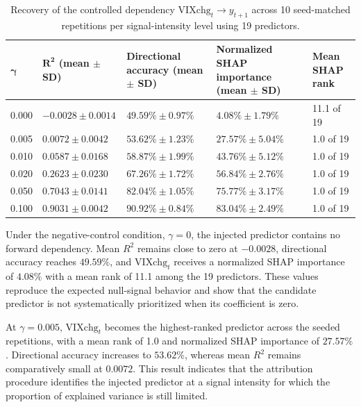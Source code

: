 \documentclass[utf8]{FrontiersinHarvard} %
\begin{document}
\begin{table}[h]
	\caption{Recovery of the controlled dependency
		\(\mathrm{VIXchg}_t\rightarrow y_{t+1}\) across 10 seed-matched
		repetitions per signal-intensity level using 19 predictors.}
	\label{tab:signal_recovery}
	\setlength{\tabcolsep}{3pt}
	\centering
	\begin{tabular}{p{38pt}p{88pt}p{105pt}p{140pt}p{72pt}}
		\hline
		\(\boldsymbol{\gamma}\) &
		\(\boldsymbol{R^2}\) \textbf{(mean \(\boldsymbol{\pm}\) SD)} &
		\textbf{Directional accuracy (mean \(\boldsymbol{\pm}\) SD)} &
		\textbf{Normalized SHAP importance (mean \(\boldsymbol{\pm}\) SD)} &
		\textbf{Mean SHAP rank} \\
		\hline
		
		0.000 &
		\(-0.0028\pm0.0014\) &
		\(49.59\%\pm0.97\%\) &
		\(4.08\%\pm1.79\%\) &
		11.1 of 19 \\
		
		0.005 &
		\(0.0072\pm0.0042\) &
		\(53.62\%\pm1.23\%\) &
		\(27.57\%\pm5.04\%\) &
		1.0 of 19 \\
		
		0.010 &
		\(0.0587\pm0.0168\) &
		\(58.87\%\pm1.99\%\) &
		\(43.76\%\pm5.12\%\) &
		1.0 of 19 \\
		
		0.020 &
		\(0.2623\pm0.0230\) &
		\(67.26\%\pm1.72\%\) &
		\(56.84\%\pm2.76\%\) &
		1.0 of 19 \\
		
		0.050 &
		\(0.7043\pm0.0141\) &
		\(82.04\%\pm1.05\%\) &
		\(75.77\%\pm3.17\%\) &
		1.0 of 19 \\
		
		0.100 &
		\(0.9031\pm0.0042\) &
		\(90.92\%\pm0.84\%\) &
		\(83.04\%\pm2.49\%\) &
		1.0 of 19 \\
		\hline
		
	\end{tabular}
	\footnotesize
\end{table}

Under the negative-control condition, \(\gamma=0\), the injected predictor contains no forward dependency. Mean \(R^2\) remains close to zero at \(-0.0028\), directional accuracy reaches \(49.59\%\), and \(\mathrm{VIXchg}_t\) receives a normalized SHAP importance of \(4.08\%\) with a mean rank of 11.1 among the 19 predictors. These values reproduce the expected null-signal behavior and show that the candidate predictor is not systematically prioritized when its coefficient is zero.

At \(\gamma=0.005\), \(\mathrm{VIXchg}_t\) becomes the highest-ranked predictor across the seeded repetitions, with a mean rank of 1.0 and normalized SHAP importance of \(27.57\%\). Directional accuracy increases to \(53.62\%\), whereas mean \(R^2\) remains comparatively small at \(0.0072\). This result indicates that the attribution procedure identifies the injected predictor at a signal intensity for which the proportion of explained variance is still limited.
\end{document}
